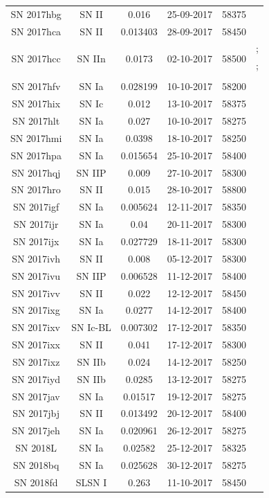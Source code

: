 \documentclass[a4paper,oneside,12pt, class=Latex/Classes/PhDthesisPSnPDF, crop=false]{standalone}
\begin{document}
\begin{longtable}{cccccc}
 SN 2017hbg & SN II & 0.016 & 25-09-2017 & 58375 & \\
 SN 2017hca & SN II & 0.013403 & 28-09-2017 & 58450 & \\
 \multirow{3}{*}{SN 2017hcc} & \multirow{3}{*}{SN IIn} & \multirow{3}{*}{0.0173} & \multirow{3}{*}{02-10-2017} & \multirow{3}{*}{58500} & \citet{2017hcc_Prieto, 2017hcc_Kumar};\\
 &&&&&\citet{2017hcc_Smith, 2017hcc_Chandra};\\
 &&&&&\citet{2017hcc_Moran, 2017hcc_Mauerhan}\\
 SN 2017hfv & SN Ia & 0.028199 & 10-10-2017 & 58200 & \\
 SN 2017hix & SN Ic & 0.012 & 13-10-2017 & 58375 & \\
 SN 2017hlt & SN Ia & 0.027 & 10-10-2017 & 58275 & \\
 SN 2017hmi & SN Ia & 0.0398 & 18-10-2017 & 58250 & \\
 SN 2017hpa & SN Ia & 0.015654 & 25-10-2017 & 58400 & \citet{2017hpa_Dutta, 2017hpa_Zeng}\\
 SN 2017hqj & SN IIP & 0.009 & 27-10-2017 & 58300 & \\
 SN 2017hro & SN II & 0.015 & 28-10-2017 & 58800 & \\
 SN 2017igf & SN Ia & 0.005624 & 12-11-2017 & 58350 & \\
 SN 2017ijr & SN Ia & 0.04 & 20-11-2017 & 58300 & \\
 SN 2017ijx & SN Ia & 0.027729 & 18-11-2017 & 58300 & \\
 SN 2017ivh & SN II & 0.008 & 05-12-2017 & 58300 & \\
 SN 2017ivu & SN IIP & 0.006528 & 11-12-2017 & 58400 &\\
 SN 2017ivv & SN II & 0.022 & 12-12-2017 & 58450 & \citet{2017ivv_gutierrez}\\
 SN 2017ixg & SN Ia & 0.0277 & 14-12-2017 & 58400 & \\
 SN 2017ixv & SN Ic-BL & 0.007302 & 17-12-2017 & 58350 & \\
 SN 2017ixx & SN II & 0.041 & 17-12-2017 & 58300 & \\
 SN 2017ixz & SN IIb & 0.024 & 14-12-2017 & 58250 & \\
 SN 2017iyd & SN IIb & 0.0285 & 13-12-2017 & 58275 & \\
 SN 2017jav & SN Ia & 0.01517 & 19-12-2017 & 58275 & \\
 SN 2017jbj & SN II & 0.013492 & 20-12-2017 & 58400 & \\
 SN 2017jeh & SN Ia & 0.020961 & 26-12-2017 & 58275 & \\
 SN 2018L & SN Ia & 0.02582 & 25-12-2017 & 58325 & \\
 SN 2018bq & SN Ia & 0.025628 & 30-12-2017 & 58275 & \\
 SN 2018fd & SLSN I & 0.263 & 11-10-2017 & 58450 & \\
\end{longtable}
\normalsize
\end{document}
